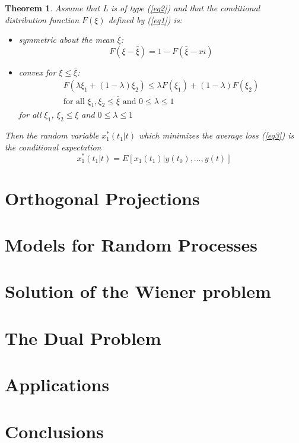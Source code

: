 \documentclass{article}
\newtheorem{theorem}{Theorem}
\begin{document}
\begin{theorem}
\label{th1}
Assume that L is of type (\ref{eq2}) and that the conditional distribution function $F(\xi)$ defined by (\ref{eq1}) is:
\begin{itemize}
\item[A] symmetric about the mean $\bar{\xi}$:
    \begin{equation*}
    F(\xi-\bar{\xi})=1-F(\bar{\xi}-xi)
    \end{equation*}
\item[B] convex for $\xi \le \bar{\xi}$:
    \begin{multline*}
    F(\lambda\xi_1+(1-\lambda)\xi_2) \le \lambda F(\xi_1)+(1-\lambda)F(\xi_2)\\
    \text{for all }\xi_1,\xi_2 \le \bar{\xi} \text{ and } 0 \le \lambda \le 1
    \end{multline*}
for all $\xi_1$, $\xi_2 \le \xi$ and $0 \le \lambda \le 1$
\end{itemize}
Then the random variable $x_1^\ast(t_1 \vert t)$ which minimizes the average loss (\ref{eq3}) is the conditional expectation
\begin{equation}
\label{eq5}
x^{\ast}_1(t_1 \vert t)=E[x_1(t_1) \vert y(t_0),\dotsc,y(t)]
\end{equation}
\end{theorem}

\section{Orthogonal Projections}
\section{Models for Random Processes}
\section{Solution of the Wiener problem}
\section{The Dual Problem}
\section{Applications}
\section{Conclusions}
\end{document}
